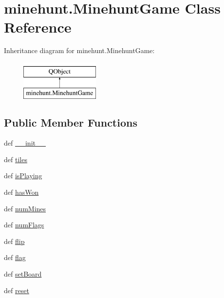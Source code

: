 \hypertarget{classminehunt_1_1MinehuntGame}{}\section{minehunt.\+Minehunt\+Game Class Reference}
\label{classminehunt_1_1MinehuntGame}
Inheritance diagram for minehunt.\+Minehunt\+Game\+:\begin{figure}[H]
\begin{center}
\leavevmode
\includegraphics[height=2.000000cm]{classminehunt_1_1MinehuntGame}
\end{center}
\end{figure}
\subsection*{Public Member Functions}
\begin{DoxyCompactItemize}
\item 
def \hyperlink{classminehunt_1_1MinehuntGame_aecb998f1a3dadf552e9d4bb21c4b6b4f}{\+\_\+\+\_\+init\+\_\+\+\_\+}
\item 
def \hyperlink{classminehunt_1_1MinehuntGame_a86dba803629df680afcde974f7738749}{tiles}
\item 
def \hyperlink{classminehunt_1_1MinehuntGame_ab579e9ff4e21c00b03339e347fca76b8}{is\+Playing}
\item 
def \hyperlink{classminehunt_1_1MinehuntGame_a00be690849786b528a6cec7032274217}{has\+Won}
\item 
def \hyperlink{classminehunt_1_1MinehuntGame_aa819638180bc71ed9eb577a27775be1e}{num\+Mines}
\item 
def \hyperlink{classminehunt_1_1MinehuntGame_a00f7c591725a1619a096c564e54f5ff5}{num\+Flags}
\item 
def \hyperlink{classminehunt_1_1MinehuntGame_ad6efeebc759f43b932dd95d793a13944}{flip}
\item 
def \hyperlink{classminehunt_1_1MinehuntGame_ae540331a3e23f560d51a63b05757da7d}{flag}
\item 
def \hyperlink{classminehunt_1_1MinehuntGame_adc518d262a9a13ad99addef61837c07a}{set\+Board}
\item 
def \hyperlink{classminehunt_1_1MinehuntGame_a374cd6ec55fb113417e5f5726a177b5a}{reset}
\end{DoxyCompactItemize}
